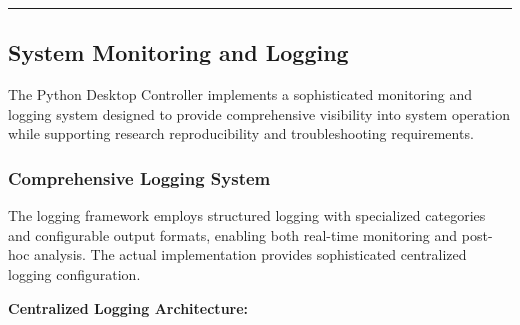 \documentclass[12pt,a4paper]{article}
\begin{document}
\hrule

\subsection{System Monitoring and Logging}

The Python Desktop Controller implements a sophisticated monitoring and logging system designed to provide comprehensive
visibility into system operation while supporting research reproducibility and troubleshooting requirements.

\subsubsection{Comprehensive Logging System}

The logging framework employs structured logging with specialized categories and configurable output formats, enabling
both real-time monitoring and post-hoc analysis. The actual implementation provides sophisticated centralized logging
configuration.

\textbf{Centralized Logging Architecture:}
\end{document}
